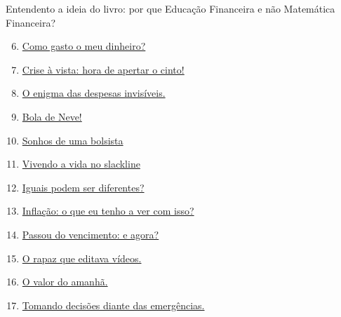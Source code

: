 \begin{apresentacao}{Entendento a ideia do livro: por que Educação Financeira e não Matemática Financeira?}
\begin{multicols}{2}
\begin{enumerate}[label=Atividade \arabic* --, wide]\setcounter{enumi}{5}
\item \hyperref[fin-ativ-6]{Como gasto o meu dinheiro?}
\item \hyperref[fin-ativ-7]{Crise à vista: hora de apertar o cinto!}
\end{enumerate}

\begin{enumerate}[label=Atividade \arabic* --, wide]\setcounter{enumi}{7}
\item \hyperref[fin-ativ-8]{O enigma das despesas invisíveis.}
\item \hyperref[fin-ativ-9]{Bola de Neve!}
\end{enumerate}

\begin{enumerate}[label=Atividade \arabic* --, wide]\setcounter{enumi}{9}
\item \hyperref[fin-ativ-10]{Sonhos de uma bolsista}
\item \hyperref[fin-ativ-11]{Vivendo a vida no slackline}
\end{enumerate}
\vspace{1em}
\columnbreak

\begin{enumerate}[label=Atividade \arabic* --, wide]\setcounter{enumi}{11}
\item \hyperref[fin-ativ-12]{Iguais podem ser diferentes?}
\item \hyperref[fin-ativ-13]{Inflação: o que eu tenho a ver com isso?}
\item \hyperref[fin-ativ-14]{Passou do vencimento: e agora?}
\end{enumerate}


\begin{enumerate}[label=Atividade \arabic* --, wide]\setcounter{enumi}{14}
\item \hyperref[fin-ativ-15]{O rapaz que editava vídeos.}
\item \hyperref[fin-ativ-16]{O valor do amanhã.}
\item \hyperref[fin-ativ-17]{Tomando decisões diante das emergências.}
\end{enumerate}
\vspace{1em}


\end{multicols}
\end{apresentacao}
